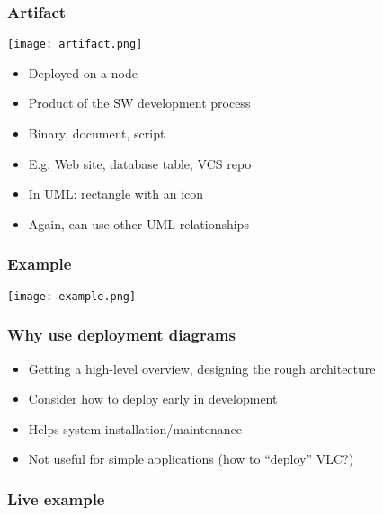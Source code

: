 \documentclass{beamer}
\begin{document}
\begin{frame}\frametitle{Artifact}

\begin{center}
\texttt{[image: artifact.png]}
\end{center}

\begin{itemize}
\item
  Deployed on a node
\item
  Product of the SW development process
\item
  Binary, document, script
\item
  E.g; Web site, database table, VCS repo
\item
  In UML: rectangle with an icon
\item
  Again, can use other UML relationships
\end{itemize}

\end{frame}

\begin{frame}\frametitle{Example}

\begin{center}
\texttt{[image: example.png]}
\end{center}

\end{frame}

\begin{frame}\frametitle{Why use deployment diagrams}

\begin{itemize}
\item
  Getting a high-level overview, designing the rough architecture
\item
  Consider how to deploy early in development
\item
  Helps system installation/maintenance
\item
  Not useful for simple applications (how to ``deploy'' VLC?)
\end{itemize}

\end{frame}

\begin{frame}\frametitle{Live example}

\end{frame}
\end{document}
